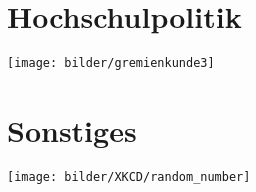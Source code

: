 \documentclass[]{papertex}
\begin{document}
	\section{Hochschulpolitik}
		\label{politik}
		\begin{minipage}[H]{1.0\linewidth}
		\begin{center}
			\centering
			\texttt{[image: bilder/gremienkunde3]}
		\end{center}
		\end{minipage}
		\begin{multicols}{2}
		\end{multicols}
	\newpage
	\section{Sonstiges}
		\label{sonstiges}
		\begin{center}
		\texttt{[image: bilder/XKCD/random\_number]}
		\end{center}
		\begin{multicols}{2}
		
		\end{multicols}
		\newpage
		\newpage
		
\end{document}
